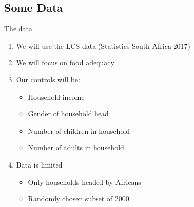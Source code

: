 \documentclass[
  ignorenonframetext,
]{beamer}
\providecommand{\tightlist}{%
  \setlength{\itemsep}{0pt}\setlength{\parskip}{0pt}}
\begin{document}
\subsection{Some Data}\label{some-data}

\begin{frame}{The data}
\protect{}\label{the-data}
\begin{enumerate}
\item
  We will use the LCS data (Statistics South Africa 2017)
\item
  We will focus on food adequacy
\item
  Our controls will be:

  \begin{itemize}
  \tightlist
  \item
    Household income
  \item
    Gender of household head
  \item
    Number of children in household
  \item
    Number of adults in household
  \end{itemize}
\item
  Data is limited

  \begin{itemize}
  \tightlist
  \item
    Only households headed by Africans
  \item
    Randomly chosen subset of 2000
  \end{itemize}
\end{enumerate}
\end{frame}
\end{document}
